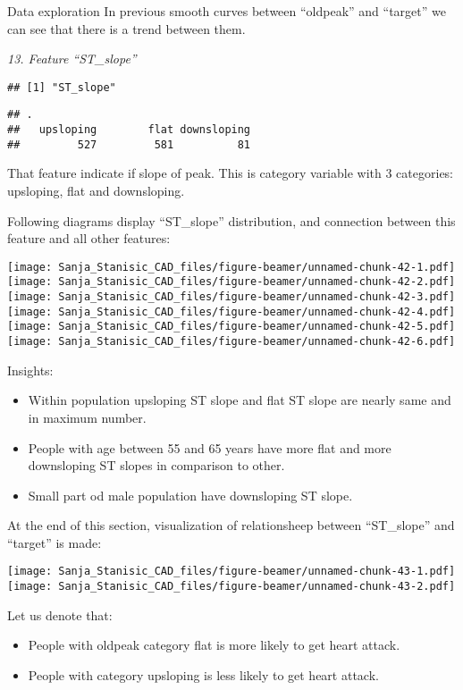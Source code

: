 \documentclass[
  ignorenonframetext,
]{beamer}
\begin{document}
\begin{frame}[fragile]{Data exploration}
In previous smooth curves between ``oldpeak'' and ``target'' we can see
that there is a trend between them.

\emph{13. Feature ``ST\_slope''}

\begin{verbatim}
## [1] "ST_slope"
\end{verbatim}

\begin{verbatim}
## .
##   upsloping        flat downsloping 
##         527         581          81
\end{verbatim}

That feature indicate if slope of peak. This is category variable with 3
categories: upsloping, flat and downsloping.

Following diagrams display ``ST\_slope'' distribution, and connection
between this feature and all other features:

\texttt{[image: Sanja\_Stanisic\_CAD\_files/figure-beamer/unnamed-chunk-42-1.pdf]}
\texttt{[image: Sanja\_Stanisic\_CAD\_files/figure-beamer/unnamed-chunk-42-2.pdf]}
\texttt{[image: Sanja\_Stanisic\_CAD\_files/figure-beamer/unnamed-chunk-42-3.pdf]}
\texttt{[image: Sanja\_Stanisic\_CAD\_files/figure-beamer/unnamed-chunk-42-4.pdf]}
\texttt{[image: Sanja\_Stanisic\_CAD\_files/figure-beamer/unnamed-chunk-42-5.pdf]}
\texttt{[image: Sanja\_Stanisic\_CAD\_files/figure-beamer/unnamed-chunk-42-6.pdf]}

Insights:

\begin{itemize}
\item
  Within population upsloping ST slope and flat ST slope are nearly same
  and in maximum number.
\item
  People with age between 55 and 65 years have more flat and more
  downsloping ST slopes in comparison to other.
\item
  Small part od male population have downsloping ST slope.
\end{itemize}

At the end of this section, visualization of relationsheep between
``ST\_slope'' and ``target'' is made:

\texttt{[image: Sanja\_Stanisic\_CAD\_files/figure-beamer/unnamed-chunk-43-1.pdf]}
\texttt{[image: Sanja\_Stanisic\_CAD\_files/figure-beamer/unnamed-chunk-43-2.pdf]}

Let us denote that:

\begin{itemize}
\item
  People with oldpeak category flat is more likely to get heart attack.
\item
  People with category upsloping is less likely to get heart attack.
\end{itemize}

\end{frame}
\end{document}
